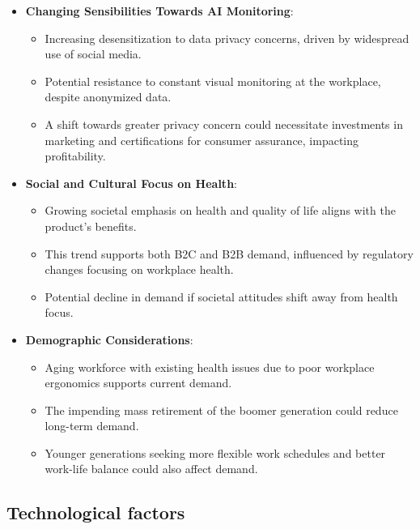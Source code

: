 \begin{itemize}
  \item \textbf{Changing Sensibilities Towards AI Monitoring}:
  \begin{itemize}
    \item Increasing desensitization to data privacy concerns, driven by widespread use of social media.
    \item Potential resistance to constant visual monitoring at the workplace, despite anonymized data.
    \item A shift towards greater privacy concern could necessitate investments in marketing and certifications for consumer assurance, impacting profitability.
  \end{itemize}

  \item \textbf{Social and Cultural Focus on Health}:
  \begin{itemize}
    \item Growing societal emphasis on health and quality of life aligns with the product's benefits.
    \item This trend supports both B2C and B2B demand, influenced by regulatory changes focusing on workplace health.
    \item Potential decline in demand if societal attitudes shift away from health focus.
  \end{itemize}

  \item \textbf{Demographic Considerations}:
  \begin{itemize}
    \item Aging workforce with existing health issues due to poor workplace ergonomics supports current demand.
    \item The impending mass retirement of the boomer generation could reduce long-term demand.
    \item Younger generations seeking more flexible work schedules and better work-life balance could also affect demand.
  \end{itemize}
\end{itemize}

\subsection{Technological factors}

